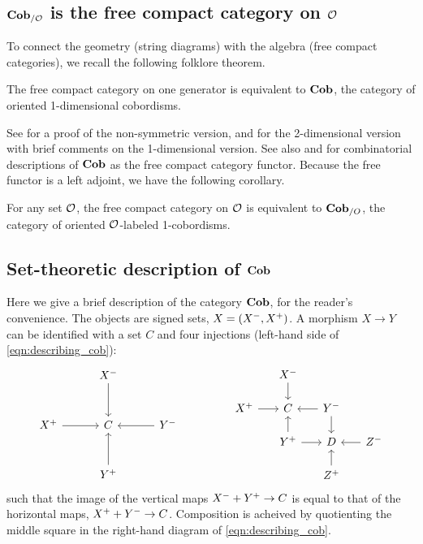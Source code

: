 \documentclass[11pt,oneside,article]{memoir}
\begin{document}
\subsection{$\mathbf{Cob}_{/\mathcal{O}}$ is the free compact category on $\mathcal{O}$}

To connect the geometry (string diagrams) with the algebra (free compact categories), we recall the following folklore theorem. 

\begin{theorem}
The free compact category on one generator is equivalent to $\mathbf{Cob}$, the category of oriented 1-dimensional cobordisms.
\end{theorem}

See \cite[Theorem 3.6]{FreydYetter} for a proof of the non-symmetric version, \cite{Kock} and \cite{BaezDolan} for the 2-dimensional version with brief comments on the 1-dimensional version. See also \cite{KellyLaplaza} and \cite{Abramsky2} for combinatorial descriptions of $\mathbf{Cob}$ as the free compact category functor.  Because the free functor is a left adjoint, we have the following corollary.

\begin{corollary}\label{cor:free_compact_is_Cob}

For any set $\mathcal{O}$, the free compact category on $\mathcal{O}$ is equivalent to $\mathbf{Cob}_{/O}$, the category of oriented $\mathcal{O}$-labeled 1-cobordisms. 

\end{corollary}


\subsection{Set-theoretic description of $\mathbf{Cob}$}

Here we give a brief description of the category $\mathbf{Cob}$, for the reader's convenience. The objects are signed sets, $X=(X^-,X^+)$. A morphism $X\to Y$ can be identified with a set $C$ and four injections (left-hand side of \eqref{eqn:describing_cob}):
\begin{equation}\label{eqn:describing_cob}
\begin{tikzcd}[row sep=1cm, column sep = 1cm]
	&\inp{X}\ar[d]\\
	\outp{X}\ar[r]&C&\inp{Y}\ar[l]\\
	&\outp{Y}\ar[u]
\end{tikzcd}
\hspace{.6in}
\begin{tikzcd}[row sep=.5cm, column sep =.5cm]
	&\inp{X}\ar[d]\\
	\outp{X}\ar[r]&C&\inp{Y}\ar[l]\ar[d]\\
	&\outp{Y}\ar[u]\ar[r]&D&\inp{Z}\ar[l]\\
	&&\outp{Z}\ar[u]
\end{tikzcd}
\end{equation}
such that the image of the vertical maps $X^-+Y^+\to C$ is equal to that of the horizontal maps, $X^++Y^-\to C$. Composition is acheived by quotienting the middle square in the right-hand diagram of \eqref{eqn:describing_cob}.
\end{document}
